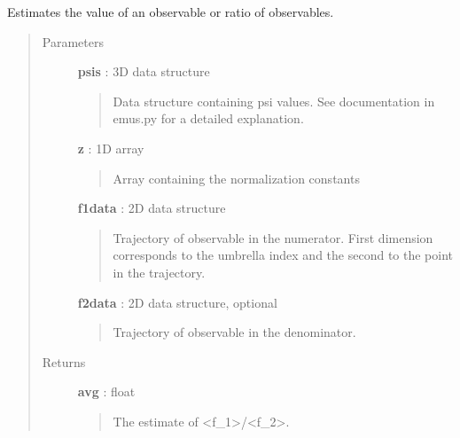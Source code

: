 \documentclass[letterpaper,10pt,english]{sphinxmanual}
\begin{document}
\begin{fulllineitems}
\label{modules/emusroutines:emusroutines.calc_obs}
Estimates the value of an observable or ratio of observables.
\begin{quote}\begin{description}
\item[{Parameters}] \leavevmode
\textbf{psis} : 3D data structure
\begin{quote}

Data structure containing psi values.  See documentation in emus.py for a detailed explanation.
\end{quote}

\textbf{z} : 1D array
\begin{quote}

Array containing the normalization constants
\end{quote}

\textbf{f1data} : 2D data structure
\begin{quote}

Trajectory of observable in the numerator.  First dimension corresponds to the umbrella index and the second to the point in the trajectory.
\end{quote}

\textbf{f2data} : 2D data structure, optional
\begin{quote}

Trajectory of observable in the denominator.
\end{quote}

\item[{Returns}] \leavevmode
\textbf{avg} : float
\begin{quote}

The estimate of \textless{}f\_1\textgreater{}/\textless{}f\_2\textgreater{}.
\end{quote}

\end{description}\end{quote}

\end{fulllineitems}

\end{document}
